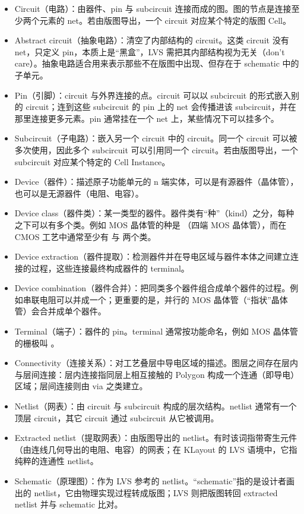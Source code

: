 \begin{itemize}
\item Circuit（电路）：由器件、pin 与 subcircuit 连接而成的图。图的节点是连接至少两个元素的 net。若由版图导出，一个 circuit 对应某个特定的版图 Cell。
\item Abstract circuit（抽象电路）：清空了内部结构的 circuit。这类 circuit 没有 net，只定义 pin，本质上是“黑盒”，LVS 需把其内部结构视为无关（don't care）。抽象电路适合用来表示那些不在版图中出现、但存在于 schematic 中的子单元。
\item Pin（引脚）：circuit 与外界连接的点。circuit 可以以 subcircuit 的形式嵌入别的 circuit；连到这些 subcircuit 的 pin 上的 net 会传播进该 subcircuit，并在那里连接更多元素。pin 通常挂在一个 net 上，某些情况下可以挂多个。
\item Subcircuit（子电路）：嵌入另一个 circuit 中的 circuit。同一个 circuit 可以被多次使用，因此多个 subcircuit 可以引用同一个 circuit。若由版图导出，一个 subcircuit 对应某个特定的 Cell Instance。
\item Device（器件）：描述原子功能单元的 n 端实体，可以是有源器件（晶体管），也可以是无源器件（电阻、电容）。
\item Device class（器件类）：某一类型的器件。器件类有“种”（kind）之分，每种之下可以有多个类。例如 MOS 晶体管的种是 （四端 MOS 晶体管），而在 CMOS 工艺中通常至少有  与  两个类。
\item Device extraction（器件提取）：检测器件并在导电区域与器件本体之间建立连接的过程，这些连接最终构成器件的 terminal。
\item Device combination（器件合并）：把同类多个器件组合成单个器件的过程。例如串联电阻可以并成一个；更重要的是，并行的 MOS 晶体管（“指状”晶体管）会合并成单个器件。
\item Terminal（端子）：器件的 pin。terminal 通常按功能命名，例如 MOS 晶体管的栅极叫 。
\item Connectivity（连接关系）：对工艺叠层中导电区域的描述。图层之间存在层内与层间连接：层内连接指同层上相互接触的 Polygon 构成一个连通（即导电）区域；层间连接则由 via 之类建立。
\item Netlist（网表）：由 circuit 与 subcircuit 构成的层次结构。netlist 通常有一个顶层 circuit，其它 circuit 通过 subcircuit 从它被调用。
\item Extracted netlist（提取网表）：由版图导出的 netlist。有时该词指带寄生元件（由连线几何导出的电阻、电容）的网表；在 KLayout 的 LVS 语境中，它指纯粹的连通性 netlist。
\item Schematic（原理图）：作为 LVS 参考的 netlist。“schematic”指的是设计者画出的 netlist，它由物理实现过程转成版图；LVS 则把版图转回 extracted netlist 并与 schematic 比对。

\end{itemize}
